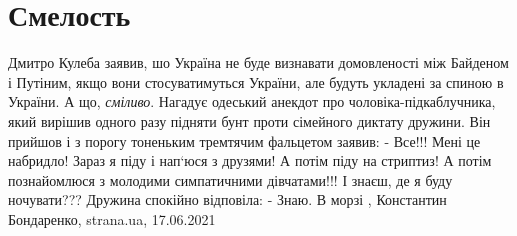  
 
 
 
 
\chapter{Смелость}

Дмитро Кулеба заявив, шо Україна не буде визнавати домовленості між Байденом і
Путіним, якщо вони стосуватимуться України, але будуть укладені за спиною в
України.  А що, \emph{сміливо}. Нагадує одеський анекдот про
чоловіка-підкаблучника, який вирішив одного разу підняти бунт проти сімейного
диктату дружини. Він прийшов і з порогу тоненьким тремтячим фальцетом заявив: -
Все!!! Мені це набридло! Зараз я піду і нап‘юся з друзями! А потім піду на
стриптиз! А потім познайомлюся з молодими симпатичними дівчатами!!! І знаєш, де
я буду ночувати???  Дружина спокійно відповіла: - Знаю. В морзі
, 
Константин Бондаренко, strana.ua, 17.06.2021


